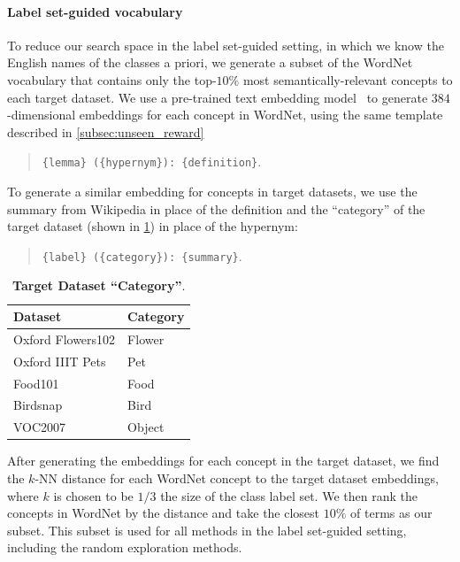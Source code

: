 \paragraph{Label set-guided vocabulary}
To reduce our search space in the label set-guided setting, in which we know the English names of the classes a priori, we generate a subset of the WordNet vocabulary that contains only the top-$10\%$ most semantically-relevant concepts to each target dataset.
We use a pre-trained text embedding model~\cite{reimers2019sentence} to generate $384$-dimensional embeddings for each concept in WordNet, using the same template described in \cref{subsec:unseen_reward}

\begin{quote}
{\tt {\small \{lemma\} (\{hypernym\}): \{definition\}}}.
\end{quote}

To generate a similar embedding for concepts in target datasets, we use the summary from Wikipedia in place of the definition and the ``category'' of the target dataset (shown in \cref{tab:dataset_categories}) in place of the hypernym:

\begin{quote}
{\tt {\small \{label\} (\{category\}): \{summary\}}}.
\end{quote}


\begin{table}
    \centering
    \begin{tabular}{ll}
    \toprule
        Dataset & Category \\
    \midrule
        Oxford Flowers102 & Flower \\
        Oxford IIIT Pets & Pet \\
        Food101 & Food \\
        Birdsnap & Bird \\
        VOC2007 & Object \\
    \bottomrule
    \end{tabular}
    \caption{\textbf{Target Dataset ``Category''}.
    }
    \label{tab:dataset_categories}
\end{table}

After generating the embeddings for each concept in the target dataset, we find the $k$-NN distance for each WordNet concept to the target dataset embeddings, where $k$ is chosen to be $1/3$ the size of the class label set.
We then rank the concepts in WordNet by the distance and take the closest $10\%$ of terms as our subset. This subset is used for all methods in the label set-guided setting, including the random exploration methods. 






